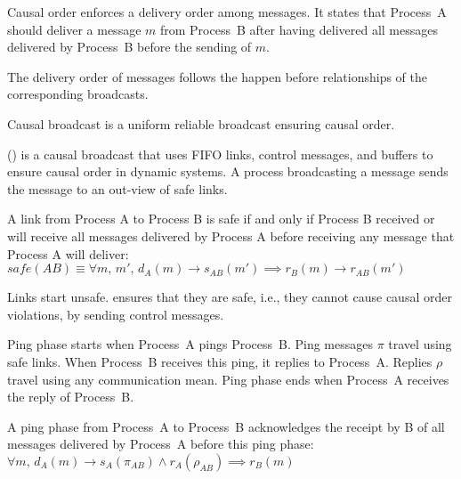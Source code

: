 Causal order enforces a delivery order among messages. It states that Process~A
should deliver a message $m$ from Process~B after having delivered all messages
delivered by Process~B before the sending of $m$.

\begin{definition}
  The delivery order of messages follows the happen before relationships of the
  corresponding broadcasts.
\end{definition}

\begin{definition}
  Causal broadcast is a uniform reliable broadcast ensuring causal order.
\end{definition}

\PCBROADCAST (\REF) is a causal broadcast that uses  FIFO
links, control messages, and buffers to ensure causal order in dynamic
systems. A process broadcasting a message sends the message to an out-view of
safe links.

\begin{definition} 
  A link from Process A to Process B is safe if and only if Process B received
  or will receive all messages delivered by Process A before receiving any
  message that Process A will
  deliver: $safe(AB) \equiv \forall m,\, m',\, d_A(m) \rightarrow s_{AB}(m')
  \implies r_B(m) \rightarrow r_{AB}(m')$
\end{definition}

Links start unsafe. \PCBROADCAST ensures that they are safe, i.e., they cannot
cause causal order violations, by sending control messages.

\begin{definition}
  Ping phase starts when Process~A pings Process~B. Ping messages $\pi$ travel
  using safe links. When Process~B receives this ping, it replies to
  Process~A. Replies $\rho$ travel using any communication mean. Ping phase ends
  when Process~A receives the reply of Process~B.
\end{definition}

\begin{lemma}
  A ping phase from Process~A to Process~B acknowledges the receipt by B of all
  messages delivered by Process~A before this ping phase:
  $\forall m,\, d_A(m) \rightarrow s_A(\pi_{AB}) \wedge r_A(\rho_{AB}) \implies
  r_B(m)$
\end{lemma}

